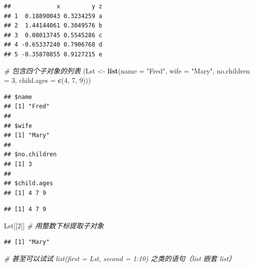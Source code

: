 \documentclass[
  b5paper,
  UTF8,twoside]{book}
\newenvironment{Shaded}{\begin{snugshade}}{\end{snugshade}}
\newcommand{\AttributeTok}[1]{\textcolor[rgb]{0.13,0.29,0.53}{#1}}
\newcommand{\CommentTok}[1]{\textcolor[rgb]{0.56,0.35,0.01}{\textit{#1}}}
\newcommand{\DecValTok}[1]{\textcolor[rgb]{0.00,0.00,0.81}{#1}}
\newcommand{\FunctionTok}[1]{\textcolor[rgb]{0.13,0.29,0.53}{\textbf{#1}}}
\newcommand{\NormalTok}[1]{#1}
\newcommand{\OtherTok}[1]{\textcolor[rgb]{0.56,0.35,0.01}{#1}}
\newcommand{\SpecialCharTok}[1]{\textcolor[rgb]{0.81,0.36,0.00}{\textbf{#1}}}
\newcommand{\StringTok}[1]{\textcolor[rgb]{0.31,0.60,0.02}{#1}}
\begin{document}
\begin{verbatim}
##             x         y z
## 1  0.18890043 0.3234259 a
## 2  1.44144061 0.3049576 b
## 3  0.08013745 0.5545286 c
## 4 -0.65337240 0.7906768 d
## 5 -0.35870855 0.9127215 e
\end{verbatim}

\begin{Shaded}
\begin{Highlighting}[]
\CommentTok{\# 包含四个子对象的列表}
\NormalTok{(Lst }\OtherTok{\textless{}{-}} \FunctionTok{list}\NormalTok{(}\AttributeTok{name =} \StringTok{"Fred"}\NormalTok{, }\AttributeTok{wife =} \StringTok{"Mary"}\NormalTok{, }\AttributeTok{no.children =} \DecValTok{3}\NormalTok{, }\AttributeTok{child.ages =} \FunctionTok{c}\NormalTok{(}\DecValTok{4}\NormalTok{, }\DecValTok{7}\NormalTok{, }\DecValTok{9}\NormalTok{)))}
\end{Highlighting}
\end{Shaded}

\begin{verbatim}
## $name
## [1] "Fred"
## 
## $wife
## [1] "Mary"
## 
## $no.children
## [1] 3
## 
## $child.ages
## [1] 4 7 9
\end{verbatim}

\begin{Shaded}
\end{Shaded}

\begin{verbatim}
## [1] 4 7 9
\end{verbatim}

\begin{Shaded}
\begin{Highlighting}[]
\NormalTok{Lst[[}\DecValTok{2}\NormalTok{]] }\CommentTok{\# 用整数下标提取子对象}
\end{Highlighting}
\end{Shaded}

\begin{verbatim}
## [1] "Mary"
\end{verbatim}

\begin{Shaded}
\begin{Highlighting}[]
\CommentTok{\# 甚至可以试试 list(first = Lst, second = 1:10) 之类的语句（list 嵌套 list）}
\end{Highlighting}
\end{Shaded}
\end{document}
